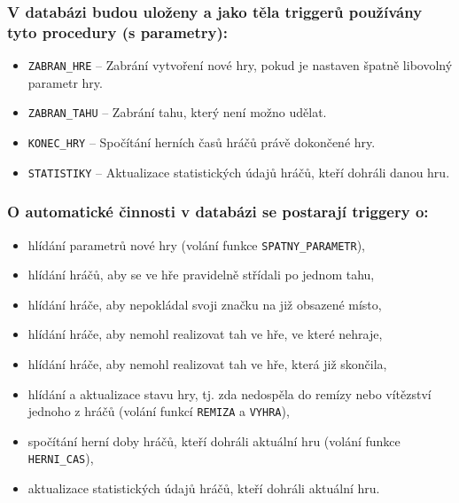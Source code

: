 \documentclass[
11pt,
a4paper,
pdftex,
czech,
titlepage
]{report}
\begin{document}
\subsubsection{V databázi budou uloženy a jako těla triggerů používány tyto procedury (s parametry):}
\begin{itemize}
    \item \texttt{ZABRAN\_HRE} -- Zabrání vytvoření nové hry, pokud je nastaven špatně libovolný parametr hry.
    \item \texttt{ZABRAN\_TAHU} -- Zabrání tahu, který není možno udělat.
    \item \texttt{KONEC\_HRY} -- Spočítání herních časů hráčů právě dokončené hry.
    \item \texttt{STATISTIKY} -- Aktualizace statistických údajů hráčů, kteří dohráli danou hru.
\end{itemize}

\subsubsection{O automatické činnosti v databázi se postarají triggery o:}
\begin{itemize}
    \item hlídání parametrů nové hry (volání funkce \texttt{SPATNY\_PARAMETR}),
    \item hlídání hráčů, aby se ve hře pravidelně střídali po jednom tahu,
    \item hlídání hráče, aby nepokládal svoji značku na již obsazené místo,
    \item hlídání hráče, aby nemohl realizovat tah ve hře, ve které nehraje,
    \item hlídání hráče, aby nemohl realizovat tah ve hře, která již skončila,
    \item hlídání a aktualizace stavu hry, tj. zda nedospěla do remízy nebo vítězství jednoho z hráčů (volání funkcí \texttt{REMIZA} a \texttt{VYHRA}),
    \item spočítání herní doby hráčů, kteří dohráli aktuální hru (volání funkce \texttt{HERNI\_CAS}),
    \item aktualizace statistických údajů hráčů, kteří dohráli aktuální hru.
\end{itemize}
\end{document}
